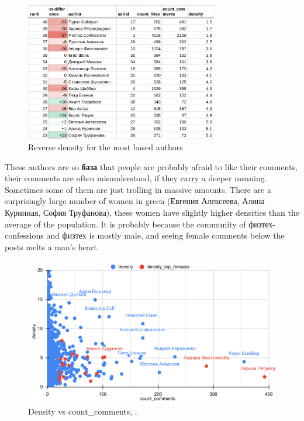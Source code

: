 \documentclass[
	12pt
] {article}
\begin{document}
	\begin{figure}[H]
		\centering
		\includegraphics[width=0.75\textwidth]{table-reverse-density}
		\caption{Reverse density for the most based authors}
		\label{table-reverse-density}
	\end{figure}

	These authors are so \textbf{база} that people are probably afraid to like their comments, their comments are often misunderstood, if they carry a deeper meaning. Sometimes some of them are just trolling in massive amounts. There are a surprisingly large number of women in green (Евгения Алексеева, Алина Куринная, София Труфанова), these women have slightly higher densities than the average of the population. It is probably because the community of физтех-confessions and физтех is mostly male, and seeing female comments below the posts melts a man's heart.

	\begin{figure}[H]
		\centering
		\includegraphics[width=1\textwidth]{fig-density-vs-count-comments}
		\caption{Density vs count\_comments, \cite{sheet-density-distribution}.}
		\label{fig-density-vs-count-comments}
	\end{figure}
\end{document}
